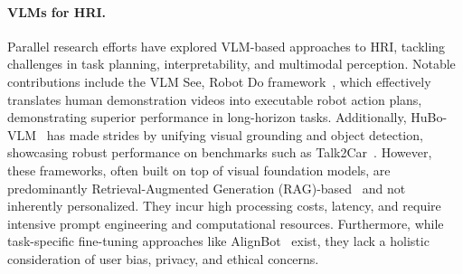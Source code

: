 \paragraph{VLMs for HRI.} Parallel research efforts have explored VLM-based approaches to HRI, tackling challenges in task planning, interpretability, and multimodal perception. Notable contributions include the VLM See, Robot Do framework~\cite{wang2024vlm}, which effectively translates human demonstration videos into executable robot action plans, demonstrating superior performance in long-horizon tasks. Additionally, HuBo-VLM~\cite{dong2023hubo} has made strides by unifying visual grounding and object detection, showcasing robust performance on benchmarks such as Talk2Car~\cite{deruyttere2019talk2car}. However, these frameworks, often built on top of visual foundation models, are predominantly Retrieval-Augmented Generation (RAG)-based~\cite{lewis2020retrieval} and not inherently personalized. They incur high processing costs, latency, and require intensive prompt engineering and computational resources. Furthermore, while task-specific fine-tuning approaches like AlignBot~\cite{chen2024alignbot} exist, they lack a holistic consideration of user bias, privacy, and ethical concerns.